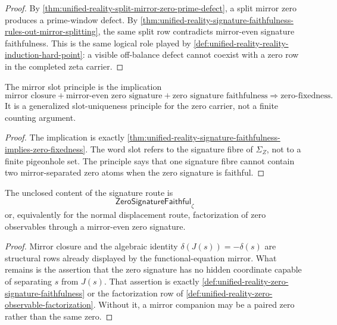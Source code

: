 \begin{proof}
By
\autoref{thm:unified-reality-split-mirror-zero-prime-defect}, a split
mirror zero produces a prime-window defect.  By
\autoref{thm:unified-reality-signature-faithfulness-rules-out-mirror-splitting},
the same split row contradicts mirror-even signature faithfulness.  This
is the same logical role played by
\autoref{def:unified-reality-reality-induction-hard-point}: a visible
off-balance defect cannot coexist with a zero row in the completed zeta
carrier.
\end{proof}

\begin{theorem}
\label{thm:unified-reality-mirror-slot-principle}
The mirror slot principle is the implication
$$
\text{mirror closure}
+
\text{mirror-even zero signature}
+
\text{zero signature faithfulness}
\Rightarrow
\text{zero-fixedness}.
$$
It is a generalized slot-uniqueness principle for the zero carrier, not
a finite counting argument.
\end{theorem}

\begin{proof}
The implication is exactly
\autoref{thm:unified-reality-signature-faithfulness-implies-zero-fixedness}.
The word slot refers to the signature fibre of $\Sigma_Z$, not to a
finite pigeonhole set.  The principle says that one signature fibre
cannot contain two mirror-separated zero atoms when the zero signature is
faithful.
\end{proof}

\begin{corollary}
\label{cor:unified-reality-signature-hard-point}
The unclosed content of the signature route is
$$
\mathsf{ZeroSignatureFaithful}_{\zeta}
$$
or, equivalently for the normal displacement route, factorization of
zero observables through a mirror-even zero signature.
\end{corollary}

\begin{proof}
Mirror closure and the algebraic identity
$\delta(J(s))=-\delta(s)$ are structural rows already displayed by the
functional-equation mirror.  What remains is the assertion that the zero
signature has no hidden coordinate capable of separating $s$ from
$J(s)$.  That assertion is exactly
\autoref{def:unified-reality-zero-signature-faithfulness} or the
factorization row of
\autoref{def:unified-reality-zero-observable-factorization}.  Without
it, a mirror companion may be a paired zero rather than the same zero.
\end{proof}

